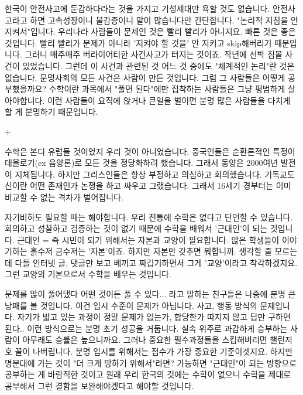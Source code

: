 한국이 안전사고에 둔감하다라는 것을 가지고 기성세대만 욕할 것도 없습니다.
안전사고라고 하면 고속성장이니 불감증이니 말이 많습니다만 간단합니다. "논리적 지침을 안 지켜서"입니다.
우리나라 사람들이 문제인 것은 빨리 빨리가 아니지요. 빠른 것은 좋은 것입니다.
빨리 빨리가 문제가 아니라 '지켜야 할 것을' 안 지키고 skip해버리기 때문입니다. 그러니 매주매주 버라이어티한 사건사고가 터지는 것이죠.
작년에 선박 침몰 사건이 있었습니다. 그런데 이 사건과 관련된 것 어느 것 중에도 "체계적인 논리"란 것은 없습니다.
문명사회의 모든 사건은 사람이 만든 것입니다. 그럼 그 사람들은 어떻게 공부했을까요?
수학이란 과목에서 "풀면 된다"에만 집착하는 사람들은 그냥 평범하게 살아야합니다.
이런 사람들이 요직에 앉거나 큰일을 벌이면 분명 많은 사람들을 다치게 할 게 분명하기 때문입니다.
\vspace{5mm}

+
\vspace{5mm}

수학은 본디 유럽들 것이었지 우리 것이 아니었습니다.
중국인들은 순환론적인 특정이데올로기(ex 음양론)로 모든 것을 정당화하려 했습니다. 그래서 동양은 2000여년 발전이 지체됩니다.
하지만 그리스인들은 항상 부정하고 의심하고 회의했습니다. 기독교도 신이란 어떤 존재인가 논쟁을 하고 싸우고 그랬습니다.
그래서 16세기 경부터는 이미 비교할 수 없는 격차가 벌어집니다.
\vspace{5mm}

자기비하도 필요할 때는 해야합니다. 우리 전통에 수학은 없다고 단언할 수 있습니다.
회의하고 성찰하고 검증하는 것이 없기 때문에 수학을 배워서 '근대인'이 되는 것입니다.
근대인 = 즉 시민이 되기 위해서는 자본과 교양이 필요합니다.
많은 학생들이 이야기하는 흙수저 금수저는 '자본'이죠. 하지만 자본만 갖추면 뭐합니까. 생각할 줄 모르는데
다들 인터넷 글, 댓글만 보고 베끼고 짜깁기하면서 그게 '교양'이라고 착각하겠지요.
그런 교양의 기본으로서 수학을 배우는 것입니다.
\vspace{5mm}

문제를 많이 풀어댔다 어떤 것이든 풀 수 있다... 라고 말하는 친구들은 나중에 분명 큰 낭패를 볼 것입니다.
이건 입시 수준이 문제가 아닙니다. 사고, 행동 방식의 문제입니다.
자기가 밟고 있는 과정이 정말 문제가 없는가, 합당한가 따지지 않고 답만 구하면 된다..
이런 방식으로는 분명 초기 성공을 거둡니다. 실속 위주로 과감하게 승부하는 사람이 아무래도 승률은 높으니까요.
그러나 중요한 필수과정들을 스킵해버리면 챌린저호 꼴이 나버립니다.
분명 입시를 위해서는 점수가 가장 중요한 기준이겟지요.
하지만 명문대에 가는 것이 "더 크게 망하기 위해서"라면?
가능하면 "근대인"이 되는 방향으로 공부하는 게 바람직한 것이고
원래 우리 한국의 것에는 수학이 없으니 수학을 제대로 공부해서 그런 결함을 보완해야겠다고 해야할 것입니다.
\vspace{5mm}

